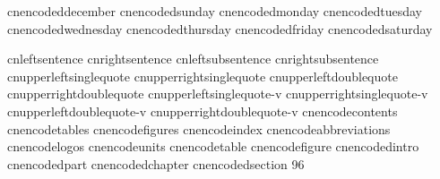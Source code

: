    cnencodeddecember         {}
   cnencodedsunday           {}
   cnencodedmonday           {}
   cnencodedtuesday          {}
   cnencodedwednesday        {}
   cnencodedthursday         {}
   cnencodedfriday           {}
   cnencodedsaturday         {}
\stopencoding

\startencoding[big5]
   cnleftsentence            {}
   cnrightsentence           {}
   cnleftsubsentence         {}
   cnrightsubsentence        {}
   cnupperleftsinglequote    {}
   cnupperrightsinglequote   {}
   cnupperleftdoublequote    {}
   cnupperrightdoublequote   {}
   cnupperleftsinglequote-v  {}
   cnupperrightsinglequote-v {}
   cnupperleftdoublequote-v  {}
   cnupperrightdoublequote-v {}
   cnencodecontents          {}
   cnencodetables            {}
   cnencodefigures           {}
   cnencodeindex             {}
   cnencodeabbreviations     {}
   cnencodelogos             {}
   cnencodeunits             {}
   cnencodetable             {}
   cnencodefigure            {}
   cnencodedintro            {}
   cnencodedpart             {}
   cnencodedchapter          {}
   cnencodedsection          { {96}}
